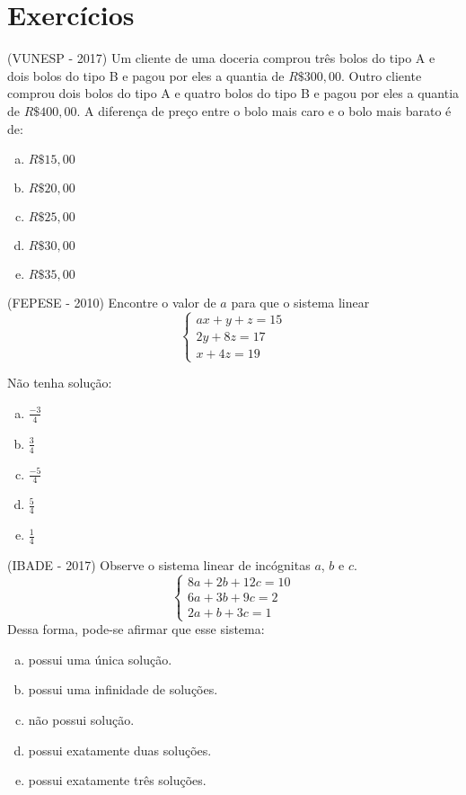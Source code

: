 
\section{Exercícios}

\begin{exer}
(VUNESP - 2017) Um cliente de uma doceria comprou três bolos do tipo A e dois bolos do tipo B e pagou por eles a quantia de $R\$ 300,00$. Outro cliente comprou dois bolos do tipo A e quatro bolos do tipo B e pagou por eles a quantia de $R\$ 400,00$. A diferença de preço entre o bolo mais caro e o bolo mais barato é de:
 \begin{enumerate}[a)]
 \item $R\$ 15,00$
 \item $R\$ 20,00$
 \item $R\$ 25,00$
 \item $R\$ 30,00$
 \item $R\$ 35,00$
 \end{enumerate}
 \end{exer}

 \begin{exer}
 (FEPESE - 2010) Encontre o valor de $a$ para que o sistema linear
 \[ \begin{cases}
 ax+y+z= 15 \\
 2y + 8z= 17 \\
 x + 4z= 19
 \end{cases} \]

 Não tenha solução:
 \begin{enumerate}[a)]
\item $\frac{-3}{4}$
\item $\frac{3}{4}$
\item $\frac{-5}{4}$
\item $\frac{5}{4}$
\item $\frac{1}{4}$
\end{enumerate}
\end{exer}

 \begin{exer}
 (IBADE - 2017) Observe o sistema linear de incógnitas $a$, $b$ e $c$.
 \[ \begin{cases}
 8a + 2b + 12c= 10 \\
 6a + 3b + 9c= 2 \\
 2a + b + 3c= 1
 \end{cases} \]
 Dessa forma, pode-se afirmar que esse sistema:
\begin{enumerate}[a)]
\item possui uma única solução.
\item possui uma infinidade de soluções.
\item não possui solução.
\item possui exatamente duas soluções.
\item possui exatamente três soluções.
\end{enumerate}
\end{exer}

